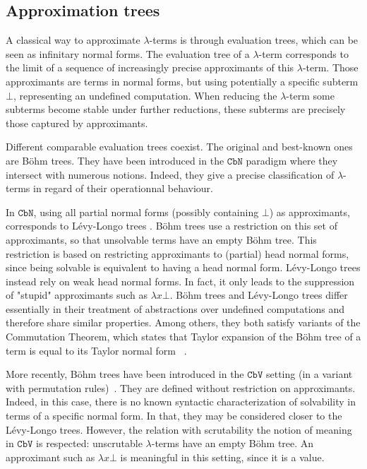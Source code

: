 \documentclass[10pt,a4paper]{article}
\newcommand{\<}{\langle}
\renewcommand{\>}{\rangle}
\newcommand{\cbn}{\ensuremath{\mathtt{CbN}}}
\newcommand{\cbv}{\ensuremath{\mathtt{CbV}}}
\newcommand{\nativeemdash}{\ifmmode\text{\textemdash}\else\textemdash\fi}
\begin{document}
\subsection{Approximation trees}\label{subsec:bohm-dbang}

A classical way to approximate $\lambda$-terms is through evaluation trees, which can be seen as infinitary normal forms. 
The evaluation tree of a $\lambda$-term corresponds to the limit of a sequence
of increasingly precise approximants of this $\lambda$-term. Those approximants
are terms in normal forms, but using potentially a specific subterm $\bot$,
representing an undefined computation. When reducing the $\lambda$-term some
subterms become stable under further reductions, these subterms are precisely
those captured by approximants. 

Different comparable evaluation trees coexist. The original and best-known ones are Böhm trees. They have been introduced in the \cbn{} paradigm where they intersect with numerous notions. Indeed, they give a precise classification of $\lambda$-terms in regard of their operationnal behaviour.

In \cbn{}, using all partial normal forms (possibly containing $\bot$) as approximants, corresponds to Lévy-Longo trees \cite{Longo83}. Böhm trees use a restriction on this set of approximants, so that unsolvable terms have an empty Böhm tree. This restriction is based on restricting approximants to (partial) head normal forms, since being solvable is equivalent to having a head normal form. Lévy-Longo trees instead rely on weak head normal forms. In fact, it only leads to the suppression of "stupid" approximants such as $\lambda x\bot$. Böhm trees and Lévy-Longo trees differ essentially in their treatment of abstractions over undefined computations and therefore share similar properties. Among others, they both satisfy variants of the Commutation Theorem, which states that Taylor expansion of the Böhm tree of a term is equal to its Taylor normal form ~\cite{ER08}.

More recently, Böhm trees have been introduced in the \cbv{} setting (in a variant with permutation rules)~\cite{kerinec:bohmTreeCbV}. 
They are defined without restriction on approximants. Indeed, in this case,
there is no known syntactic characterization of solvability in terms of a
specific normal form. In that, they may be considered closer to the Lévy-Longo
trees. However, the relation with scrutability \nativeemdash{} the notion of meaning \nativeemdash{} in
\cbv{} is respected: unscrutable $\lambda$-terms have an empty Böhm tree. An
approximant such as $\lambda x\bot$ is meaningful in this setting, since it is a
value.
\end{document}
